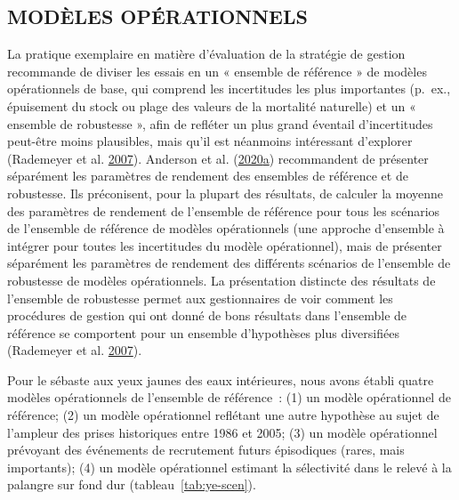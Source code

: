 \documentclass[11pt]{book}
\begin{document}
\hypertarget{sec:approach3-oms}{%
\subsection{MODÈLES OPÉRATIONNELS}\label{sec:approach3-oms}}

La pratique exemplaire en matière d'évaluation de la stratégie de gestion recommande de diviser les essais en un « ensemble de référence » de modèles opérationnels de base, qui comprend les incertitudes les plus importantes (p.~ex., épuisement du stock ou plage des valeurs de la mortalité naturelle) et un « ensemble de robustesse », afin de refléter un plus grand éventail d'incertitudes peut-être moins plausibles, mais qu'il est néanmoins intéressant d'explorer (Rademeyer et al. \protect\hyperlink{ref-rademeyer2007}{2007}). Anderson et al. (\protect\hyperlink{ref-anderson2020gfmp}{2020}\protect\hyperlink{ref-anderson2020gfmp}{a}) recommandent de présenter séparément les paramètres de rendement des ensembles de référence et de robustesse. Ils préconisent, pour la plupart des résultats, de calculer la moyenne des paramètres de rendement de l'ensemble de référence pour tous les scénarios de l'ensemble de référence de modèles opérationnels (une approche d'ensemble à intégrer pour toutes les incertitudes du modèle opérationnel), mais de présenter séparément les paramètres de rendement des différents scénarios de l'ensemble de robustesse de modèles opérationnels. La présentation distincte des résultats de l'ensemble de robustesse permet aux gestionnaires de voir comment les procédures de gestion qui ont donné de bons résultats dans l'ensemble de référence se comportent pour un ensemble d'hypothèses plus diversifiées (Rademeyer et al. \protect\hyperlink{ref-rademeyer2007}{2007}).

Pour le sébaste aux yeux jaunes des eaux intérieures, nous avons établi quatre modèles opérationnels de l'ensemble de référence~: (1) un modèle opérationnel de référence; (2) un modèle opérationnel reflétant une autre hypothèse au sujet de l'ampleur des prises historiques entre 1986 et 2005; (3) un modèle opérationnel prévoyant des événements de recrutement futurs épisodiques (rares, mais importants); (4) un modèle opérationnel estimant la sélectivité dans le relevé à la palangre sur fond dur (tableau~\ref{tab:ye-scen}).
\end{document}
